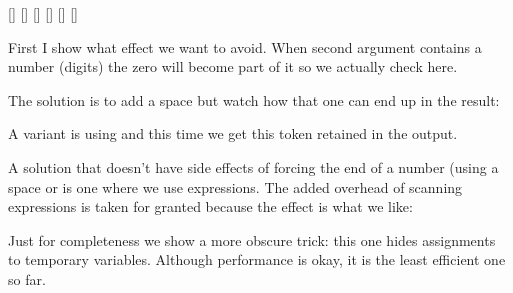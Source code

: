 \startbuffer[b]
\starttabulate[|T|T|]
\NC \type {\whatever{1pt}{2pt}}         \NC \edef\temp{\whatever        {1pt}{2pt}}[\meaning\temp] \NC \NR
\NC \type {\whatever{1pt}{1pt}}         \NC \edef\temp{\whatever        {1pt}{1pt}}[\meaning\temp] \NC \NR
\NC {} \NC \edef\temp{}[\meaning\temp] \NC \NR
\NC {} \NC \edef\temp{}[\meaning\temp] \NC \NR
\NC \type {\whatever\MyDimenA\MyDimenB} \NC \edef\temp{\whatever\MyDimenA\MyDimenB}[\meaning\temp] \NC \NR
\NC \type {\whatever\MyDimenA\MyDimenB} \NC \edef\temp{\whatever\MyDimenA\MyDimenB}[\meaning\temp] \NC \NR
\stoptabulate
\stopbuffer

First I show what effect we want to avoid. When second argument contains a number
(digits) the zero will become part of it so we actually check 
here.

\startbuffer[c]
\stopbuffer

\typebuffer[c] \getbuffer[c,b]

The solution is to add a space but watch how that one can end up in the result:

\startbuffer[c]
\stopbuffer

\typebuffer[c] \getbuffer[c,b]

A variant is using \type {\relax} and this time we get this token retained in
the output.

\startbuffer[c]
\stopbuffer

\typebuffer[c] \getbuffer[c,b]

A solution that doesn't have side effects of forcing the end of a number (using a
space or \type {\relax} is one where we use expressions. The added overhead of
scanning expressions is taken for granted because the effect is what we like:

\startbuffer[c]
\stopbuffer

\typebuffer[c] \getbuffer[c,b]

Just for completeness we show a more obscure trick: this one hides assignments to
temporary variables. Although performance is okay, it is the least efficient
one so far.

\ifdefined\beginlocalcontrol

\startbuffer[c]
\stopbuffer

